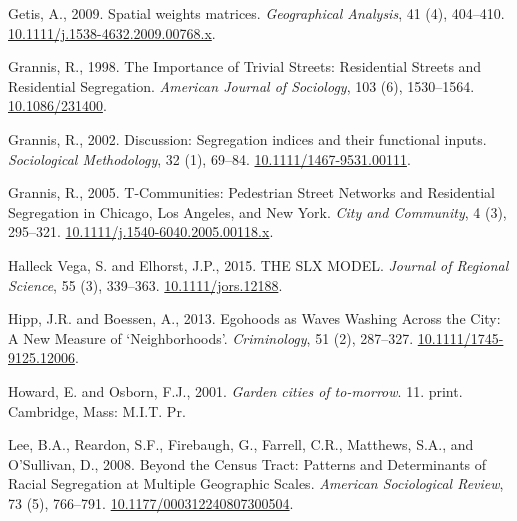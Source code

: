 \documentclass[
  10pt,
]{article}
\newlength{\cslhangindent}
\newenvironment{CSLReferences}[2] %
 {%
  \setlength{\parindent}{0pt}
  \ifodd #1 \everypar{\setlength{\hangindent}{\cslhangindent}}\ignorespaces\fi
  \ifnum #2 > 0
  \setlength{\parskip}{#2\baselineskip}
  \fi
 }%
 {}
\begin{document}
\begin{CSLReferences}{1}{0}
\leavevmode{}%
Getis, A., 2009. Spatial weights matrices. \emph{Geographical Analysis},
41 (4), 404--410.
\href{https://doi.org/10.1111/j.1538-4632.2009.00768.x}{10.1111/j.1538-4632.2009.00768.x}.

\leavevmode{}%
Grannis, R., 1998. The {Importance} of {Trivial Streets}: {Residential
Streets} and {Residential Segregation}. \emph{American Journal of
Sociology}, 103 (6), 1530--1564.
\href{https://doi.org/10.1086/231400}{10.1086/231400}.

\leavevmode{}%
Grannis, R., 2002. Discussion: Segregation indices and their functional
inputs. \emph{Sociological Methodology}, 32 (1), 69--84.
\href{https://doi.org/10.1111/1467-9531.00111}{10.1111/1467-9531.00111}.

\leavevmode{}%
Grannis, R., 2005. T-{Communities}: {Pedestrian Street Networks} and
{Residential Segregation} in {Chicago}, {Los Angeles}, and {New York}.
\emph{City and Community}, 4 (3), 295--321.
\href{https://doi.org/10.1111/j.1540-6040.2005.00118.x}{10.1111/j.1540-6040.2005.00118.x}.

\leavevmode{}%
Halleck Vega, S. and Elhorst, J.P., 2015. {THE SLX MODEL}. \emph{Journal
of Regional Science}, 55 (3), 339--363.
\href{https://doi.org/10.1111/jors.12188}{10.1111/jors.12188}.

\leavevmode{}%
Hipp, J.R. and Boessen, A., 2013. Egohoods as {Waves Washing Across} the
{City}: {A New Measure} of {`{Neighborhoods}'}. \emph{Criminology}, 51
(2), 287--327.
\href{https://doi.org/10.1111/1745-9125.12006}{10.1111/1745-9125.12006}.

\leavevmode{}%
Howard, E. and Osborn, F.J., 2001. \emph{Garden cities of to-morrow}.
11. print. {Cambridge, Mass}: {M.I.T. Pr}.

\leavevmode{}%
Lee, B.A., Reardon, S.F., Firebaugh, G., Farrell, C.R., Matthews, S.A.,
and O'Sullivan, D., 2008. Beyond the {Census Tract}: {Patterns} and
{Determinants} of {Racial Segregation} at {Multiple Geographic Scales}.
\emph{American Sociological Review}, 73 (5), 766--791.
\href{https://doi.org/10.1177/000312240807300504}{10.1177/000312240807300504}.


\end{CSLReferences}
\end{document}
